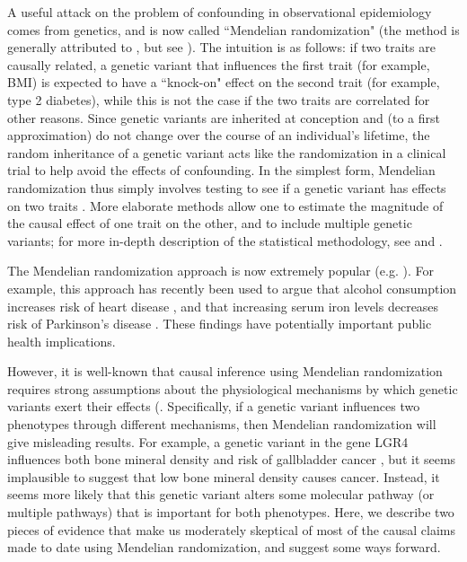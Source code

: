 \documentclass[11pt,titlepage]{article}
\begin{document}
A useful attack on the problem of confounding in observational epidemiology comes from genetics, and is now called ``Mendelian randomization" (the method is generally attributed to \citet{Katan:1986aa}, but see \citet{Katan:2004aa}). The intuition is as follows: if two traits are causally related, a genetic variant that influences the first trait (for example, BMI) is expected to have a ``knock-on" effect on the second trait (for example, type 2 diabetes), while this is not the case if the two traits are correlated for other reasons. Since genetic variants are inherited at conception and (to a first approximation) do not change over the course of an individual's lifetime, the random inheritance of a genetic variant acts like the randomization in a clinical trial to help avoid the effects of confounding. In the simplest form, Mendelian randomization thus simply involves testing to see if a genetic variant has effects on two traits \citep{Katan:1986aa}. More elaborate methods allow one to estimate the magnitude of the causal effect of one trait on the other, and to include multiple genetic variants; for more in-depth description of the statistical methodology, see \citet{Didelez:2007aa, VanderWeele:2014aa} and  \citet{Davey-Smith:2014aa}. 

The Mendelian randomization approach is now extremely popular (e.g. \citep{Pichler:2013aa, Voight:2012aa, Holmes:2014aa, Lim:2014aa, De-Silva:2011aa, Welsh:2010aa, Fall:2013aa, Holmes:2014ab, Klerk:2002aa, Casas:2005aa, C-Reactive-Protein-Coronary-Heart-Disease-Genetics-Collaboration-CCGC:2011aa}). For example, this approach has recently been used to argue that alcohol consumption increases risk of heart disease \citep{Holmes:2014ab}, and that increasing serum iron levels decreases risk of Parkinson's disease \citep{Pichler:2013aa}. These findings have potentially important public health implications. 

However, it is well-known that causal inference using Mendelian randomization requires strong assumptions about the physiological mechanisms by which genetic variants exert their effects (\citep{Davey-Smith:2014aa, VanderWeele:2014aa}. Specifically, if a genetic variant influences two phenotypes through different mechanisms, then Mendelian randomization will give misleading results. For example, a genetic variant in the gene LGR4 influences both bone mineral density and risk of gallbladder cancer \citep{Styrkarsdottir:2013aa}, but it seems implausible to suggest that low bone mineral density causes cancer. Instead, it seems more likely that this genetic variant alters some molecular pathway (or multiple pathways) that is important for both phenotypes. Here, we describe two pieces of evidence that make us moderately skeptical of most of the causal claims made to date using Mendelian randomization, and suggest some ways forward. 
  
\end{document}
